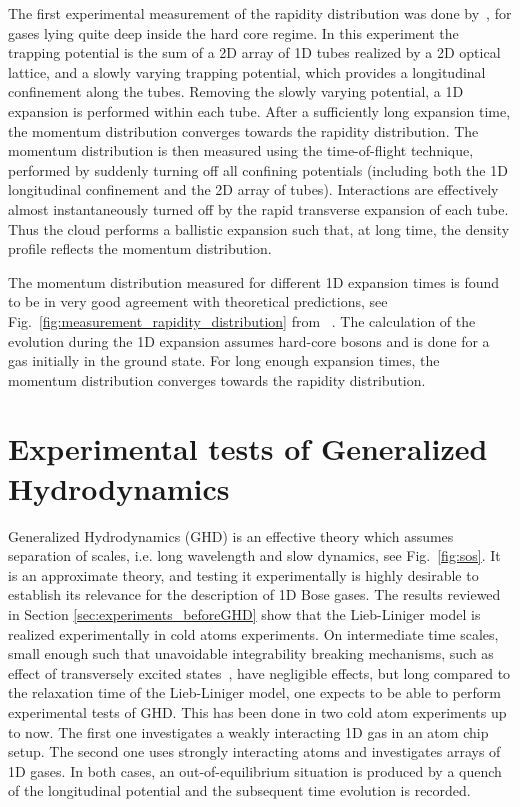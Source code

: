 \documentclass[onecolumn,amsfonts,showpacs,superscriptaddress]{revtex4-1}
\begin{document}
The first experimental measurement of the rapidity distribution was done by~\cite{wilson_observation_2020}, for gases lying quite deep inside the hard core regime.
In this experiment the trapping potential is the sum 
of a 2D array of 1D tubes realized by a 2D optical lattice, and a slowly varying trapping potential, which 
provides a longitudinal confinement along the tubes. 
Removing the slowly varying potential, a
1D expansion is performed within each tube. After a sufficiently long 
expansion time, the momentum distribution converges 
towards the rapidity distribution. The momentum distribution is then measured using the time-of-flight technique, performed by suddenly turning off all confining potentials (including both the 1D longitudinal confinement and the 2D array of tubes). Interactions are effectively almost instantaneously turned off by the rapid transverse expansion of each tube. Thus the cloud performs a ballistic expansion  such that, 
at long time, the density profile reflects the momentum  distribution.  

The momentum distribution measured for different 1D expansion times is found to be in very good agreement with 
theoretical predictions, see Fig.~\ref{fig:measurement_rapidity_distribution} from ~\citep{wilson_observation_2020}. The calculation of the evolution during the 1D expansion assumes hard-core bosons and is done for a gas initially in the ground state. 
For long enough expansion times, the momentum distribution converges towards the rapidity distribution.




\newpage


\section{Experimental tests of Generalized Hydrodynamics}
\label{sec:GHDexperiment}
Generalized Hydrodynamics (GHD) is an effective theory which assumes separation of scales, i.e. long wavelength and slow dynamics, see Fig.~\ref{fig:sos}. 
It is an approximate theory, and testing it experimentally is highly desirable to establish its relevance for the description of 1D Bose gases. The results reviewed in Section \ref{sec:experiments_beforeGHD} show that the Lieb-Liniger model is realized experimentally 
in cold atoms experiments.
On intermediate time scales, small enough such that
unavoidable integrability breaking mechanisms,
such as effect of transversely excited states~\citep{mazets_integrability_2011}, 
have negligible effects, but long compared to the 
relaxation time of the Lieb-Liniger model, one expects to 
be able to perform experimental tests of GHD. This has been done in two cold atom experiments up to now. The first one investigates a weakly interacting 1D gas in an atom chip setup. The second one uses strongly interacting atoms and investigates arrays of 1D gases. 
In both cases, an out-of-equilibrium 
situation is produced by a quench of the longitudinal potential and the subsequent time evolution is recorded.
\end{document}

